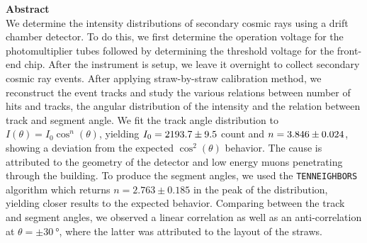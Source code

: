 \documentclass[a4paper]{report}
\numberwithin{equation}{section}
\begin{document}
\begin{titlepage}
	\vspace*{5em}

	\begin{minipage}{0.8\textwidth}
		\begin{centering}
			\textbf{Abstract}\\[0.2cm]
            We determine the intensity distributions of secondary cosmic rays using a drift chamber detector.
			 To do this, we first determine the operation voltage for the photomultiplier tubes followed 
			 by determining the threshold voltage for the front-end chip. After the instrument is setup, we 
			 leave it overnight to collect secondary cosmic ray events. After applying straw-by-straw calibration method,
			  we reconstruct the event tracks and study the various relations between number of hits and tracks, the angular
			   distribution of the intensity and the relation between track and segment angle. We fit the track angle distribution to 
			   $I(\theta) = I_0 \cos ^n (\theta)$, yielding $I_0 = \num{2193.7 \pm 9.5}$ count and $n = \num{3.846 \pm 0.024}$, showing a 
			   deviation from the expected $\cos^2(\theta)$ behavior. The cause is attributed to the geometry of the detector 
			   and low energy muons penetrating through the building. To produce the segment angles, we used the \texttt{TENNEIGHBORS}
			   algorithm which returns $n = 2.763 \pm 0.185$ in the peak of the distribution, yielding closer results to the expected behavior. 
			   Comparing between the track and segment angles, we observed a linear correlation as well as an anti-correlation at 
			   $\theta = \pm \SI{30}{\degree}$, where the latter was attributed to the layout of the straws. 
		\end{centering}
	\end{minipage}
	
	
	
	
	
	
	 
	
	
\end{titlepage}
\end{document}
